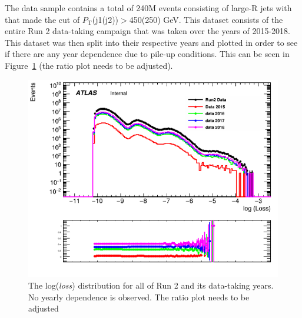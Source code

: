 The data sample contains a total of 240M events consisting of large-R jets with that made the cut of $\textit{P}_{\textrm{T}}$(j1(j2))$>$450(250) GeV. This dataset consists 
of the entire Run 2 data-taking campaign that was taken over the years of 2015-2018. This dataset was then split into their respective years and plotted in order to see if 
there are any year dependence due to pile-up conditions. This can be seen in Figure~\ref{fig:sh4b-year-dep} (the ratio plot needs to be adjusted).

\begin{figure}[ht]
    \centering
    \includegraphics[scale=0.7]{figs/ch7/year-dep.png}%
    \caption{The log(\textit{loss}) distribution for all of Run 2 and its data-taking years. No yearly dependence is observed. The ratio plot needs to be adjusted}
\label{fig:sh4b-year-dep}
\end{figure}

